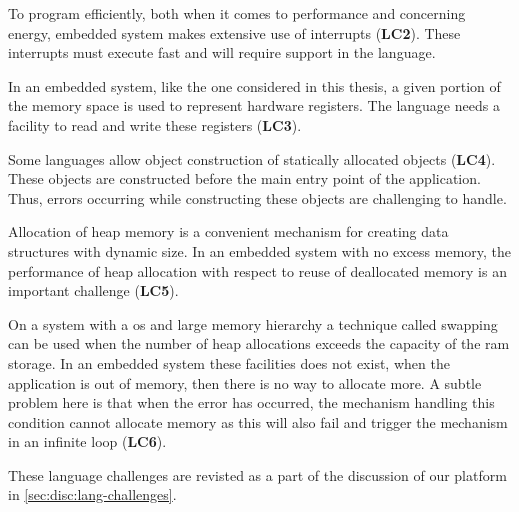 To program efficiently, both when it comes to performance and concerning energy, embedded system makes extensive use of interrupts (\textbf{LC2}).
These interrupts must execute fast and will require support in the language.

In an embedded system, like the one considered in this thesis, a given portion of the memory space is used to represent hardware registers.
The language needs a facility to read and write these registers (\textbf{LC3}).

Some languages allow object construction of statically allocated objects (\textbf{LC4}).
These objects are constructed before the main entry point of the application.
Thus, errors occurring while constructing these objects are challenging to handle.

Allocation of heap memory is a convenient mechanism for creating data structures with dynamic size.
In an embedded system with no excess memory, the performance of heap allocation with respect to reuse of deallocated memory is an important challenge (\textbf{LC5}).

On a system with a \gls{os} and large memory hierarchy a technique called swapping can be used when the number of heap allocations exceeds the capacity of the \gls{ram} storage.
In an embedded system these facilities does not exist, when the application is out of memory, then there is no way to allocate more.
A subtle problem here is that when the error has occurred, the mechanism handling this condition cannot allocate memory as this will also fail and trigger the mechanism in an infinite loop (\textbf{LC6}).

These language challenges are revisted as a part of the discussion of our platform in \autoref{sec:disc:lang-challenges}.
